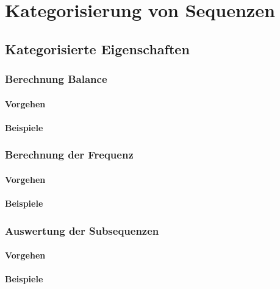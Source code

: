 \chapter{Kategorisierung von Sequenzen}

\section{Kategorisierte Eigenschaften}

\subsection{Berechnung Balance}

\subsubsection{Vorgehen}

\subsubsection{Beispiele}

\subsection{Berechnung der Frequenz}

\subsubsection{Vorgehen}

\subsubsection{Beispiele}

\subsection{Auswertung der Subsequenzen}

\subsubsection{Vorgehen}

\subsubsection{Beispiele}